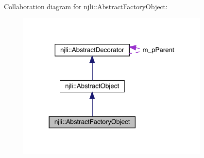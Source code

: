 Collaboration diagram for njli\+:\+:Abstract\+Factory\+Object\+:\nopagebreak
\begin{figure}[H]
\begin{center}
\leavevmode
\includegraphics[width=273pt]{classnjli_1_1_abstract_factory_object__coll__graph}
\end{center}
\end{figure}
